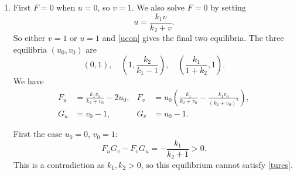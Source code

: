 \documentclass[a4paper, 12pt]{article}
\begin{document}
\begin{enumerate}[label={\bf \arabic{*}.\;}, ref={\arabic{*}},itemsep=3ex, left=0ex]
{\begin{enumerate}[label=(\alph*)]
{              Next we want there to be some $k_s>0$ for which $\lambda(k_s)>0$, so they grow. Since $F_u + G_v<0$ the trace must be negative ($v_0$ must be positive) so we can only have positive eigenvalues $\lambda$ when $\det<0$, i.e.
              \begin{equation}
                D(1+v_0)k_s^2 - k_s\gamma\left(G_v(1+v_0) + D F_u - G_u u_0\right) + \gamma^2(F_u G_v - F_vG_u) >0.
              \end{equation}
              Since $F_uG_v - F_vG_u>0$ and $D(1+v_0)>0$ this can only occur if
              \begin{equation}
                G_v(1+v_0) + D F_u - G_u u_0 >0,
              \end{equation}
              the third condition. But this is necessary not sufficient, finally, if we want real $k_s$ to solve $\det\m{J}=0$ we need the discriminant of the quadratic in $k_s$ to be positive, i.e.
              \begin{equation}
                \left(G_v(1+v_0) + D F_u - G_u u_0\right)^2 - 4 D(1+v_0)(F_u G_v - F_vG_u)\geq 0,
              \end{equation}
              the final condition.
            }
          \item{
              First $F=0$ when $u=0$, so $v=1$. We also solve $F=0$ by setting
              \begin{equation}
                \label{ucon}
                u = \frac{k_1v}{k_2+v}.
              \end{equation}
              So either $v=1$ or $u=1$ and \cref{ucon} gives the final two equilibria. The three equilibria $(u_0,v_0)$ are
              \begin{equation}
                (0,1),\quad \left(1,\frac{k_2}{k_1-1}\right) ,\quad \left(\frac{k_1}{1+k_2},1\right).
              \end{equation}
              We have
              \begin{align}
                F_u &= \frac{k_1 v_0}{k_2+ v_0}-2u_0, & F_v &= u_0\left(\frac{k_1}{k_2 +v_0}- \frac{k_1 v_0}{(k_2+v_0)^2}\right),\nonumber\\
                G_u &= v_0-1, & G_v & = u_0-1.
              \end{align}

              First the case $u_0=0$, $v_0=1$:
              \begin{equation}
                F_uG_v - F_vG_u =-\frac{k_1}{k_2+1} >0.
              \end{equation}
              This is a contradiction as $k_1,k_2>0$, so this equilibrium cannot satisfy \cref{tures}.

}
\end{enumerate}}
\end{enumerate}
\end{document}

